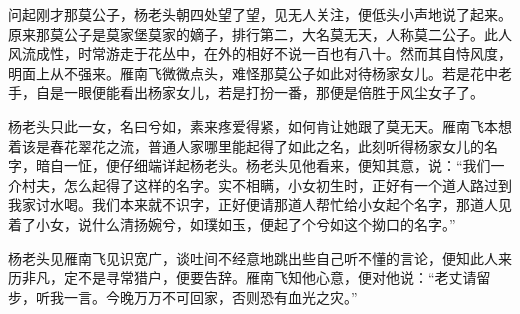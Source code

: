 问起刚才那莫公子，杨老头朝四处望了望，见无人关注，便低头小声地说了起来。原来那莫公子是莫家堡莫家的嫡子，排行第二，大名莫无天，人称莫二公子。此人风流成性，时常游走于花丛中，在外的相好不说一百也有八十。然而其自恃风度，明面上从不强来。雁南飞微微点头，难怪那莫公子如此对待杨家女儿。若是花中老手，自是一眼便能看出杨家女儿，若是打扮一番，那便是倍胜于风尘女子了。

杨老头只此一女，名曰兮如，素来疼爱得紧，如何肯让她跟了莫无天。雁南飞本想着该是春花翠花之流，普通人家哪里能起得了如此之名，此刻听得杨家女儿的名字，暗自一怔，便仔细端详起杨老头。杨老头见他看来，便知其意，说：“我们一介村夫，怎么起得了这样的名字。实不相瞒，小女初生时，正好有一个道人路过到我家讨水喝。我们本来就不识字，正好便请那道人帮忙给小女起个名字，那道人见着了小女，说什么清扬婉兮，如璞如玉，便起了个兮如这个拗口的名字。”

杨老头见雁南飞见识宽广，谈吐间不经意地跳出些自己听不懂的言论，便知此人来历非凡，定不是寻常猎户，便要告辞。雁南飞知他心意，便对他说：“老丈请留步，听我一言。今晚万万不可回家，否则恐有血光之灾。”
